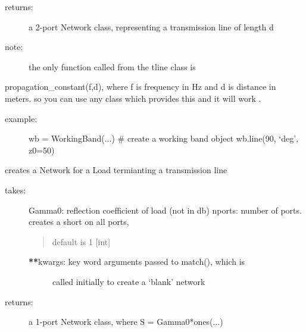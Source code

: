 \documentclass[letterpaper,10pt,english]{sphinxmanual}
\begin{document}
\begin{fulllineitems}
\begin{fulllineitems}
\begin{description}
\item[{returns:}] \leavevmode
a 2-port Network class, representing a transmission line of 
length d

\item[{note: }] \leavevmode
the only function called from the tline class is

\end{description}

propagation\_constant(f,d), where f is frequency in Hz and d is
distance in meters. so you can use any class  which provides this
and it  will work .
\begin{description}
\item[{example:}] \leavevmode
wb = WorkingBand(...) \# create a working band object
wb.line(90, `deg', z0=50)

\end{description}

\end{fulllineitems}


\begin{fulllineitems}
\label{auto_workingband:mwavepy.WorkingBand.load}
creates a Network for a Load termianting a transmission line
\begin{description}
\item[{takes:}] \leavevmode
Gamma0: reflection coefficient of load (not in db)
nports: number of ports. creates a short on all ports,
\begin{quote}

default is 1 {[}int{]}
\end{quote}
\begin{description}
\item[{{\color{red}\bfseries{}**}kwargs: key word arguments passed to match(), which is }] \leavevmode
called initially to create a `blank' network

\end{description}

\item[{returns:}] \leavevmode
a 1-port Network class, where  S = Gamma0*ones(...)

\end{description}

\end{fulllineitems}



\end{fulllineitems}
\end{document}
